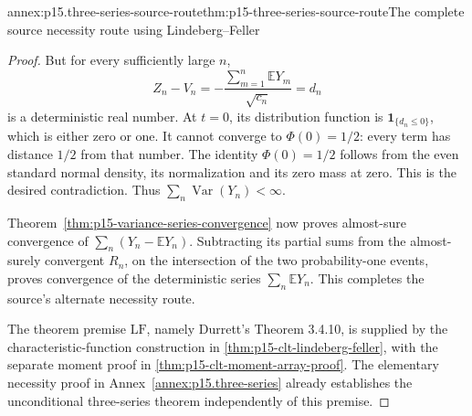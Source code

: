 \begin{annexitem}{annex:p15.three-series-source-route}{thm:p15-three-series-source-route}{The complete source necessity route using Lindeberg--Feller}
\begin{proof}
But for every sufficiently large \(n\),
\[
 Z_n-V_n=-\frac{\sum_{m=1}^n\mathbb EY_m}{\sqrt{c_n}}
                   =d_n
\]
is a deterministic real number. At \(t=0\), its distribution
function is \(\mathbf1_{\{d_n\leq0\}}\), which is either
zero or one. It cannot converge to \(\Phi(0)=1/2\): every
term has distance \(1/2\) from that number. The identity
\(\Phi(0)=1/2\) follows from the even standard normal density,
its normalization and its zero mass at zero. This is the desired
contradiction. Thus \(\sum_n\operatorname{Var}(Y_n)<\infty\).

Theorem~\ref{thm:p15-variance-series-convergence} now proves
almost-sure convergence of \(\sum_n(Y_n-\mathbb EY_n)\).
Subtracting its partial sums from the almost-surely convergent
\(R_n\), on the intersection of the two probability-one events,
proves convergence of the deterministic series \(\sum_n\mathbb EY_n\).
This completes the source's alternate necessity route.

The theorem premise \(\mathrm{LF}\), namely Durrett's Theorem 3.4.10,
is supplied by the characteristic-function construction in
\cref{thm:p15-clt-lindeberg-feller}, with the separate moment proof
in \cref{thm:p15-clt-moment-array-proof}.
The elementary necessity proof in
Annex~\ref{annex:p15.three-series} already establishes the
unconditional three-series theorem independently of this premise.
\end{proof}
\end{annexitem}

